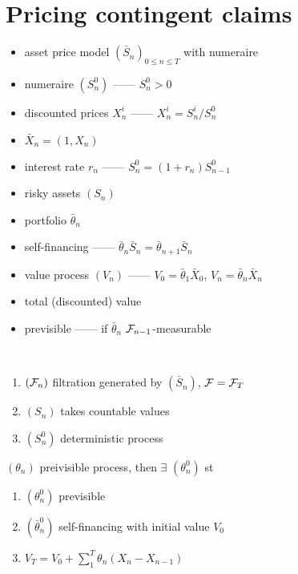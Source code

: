 \section{Pricing contingent claims}\label{sec:pricing-contingent-claims}

\begin{itemize}
    \item asset price model $(\bar S_n)_{0\leq n \leq T}$ with numeraire
    \item numeraire $(S_n^0)$ ------ $S^0_n > 0$
    \item discounted prices $X_n^i$ ------ $X_n^i = S^i_n / S_n^0$
    \item $\bar X_n = (1, X_n)$
    \item interest rate $r_n$ ------ $S_n^0 = (1 + r_n) S^0_{n-1}$
    \item risky assets $(S_n)$
    \item portfolio $\bar \theta_n$
    \item self-financing ------ $\bar \theta_n \bar S_n = \bar \theta_{n+1} \bar S_n$
    \item value process $(V_n)$ ------ $V_0 = \bar \theta_1 \bar X_0$, $V_n = \bar \theta_n \bar X_n$
    \item total (discounted) value
    \item previsible ------ if $\bar \theta_n$ $\mathcal{F}_{n-1}$-measurable
\end{itemize}

\begin{setting}\,
    \begin{enumerate}
        \item $(\mathcal{F}_n)$ filtration generated by $(\bar S_n)$, $\mathcal{F} = \mathcal{F}_T$
        \item $(S_n)$ takes countable values
        \item $(S_n^0)$ deterministic process
    \end{enumerate}
\end{setting}

\begin{prop}
    $(\theta_n)$ preivisible process, then $\exists$ $(\theta_n^0)$ st
    \begin{enumerate}
        \item $(\theta_n^0)$ previsible
        \item $(\bar\theta_n^0)$ self-financing with initial value $V_0$
        \item $V_T = V_0 + \sum^T_1 \theta_n(X_n - X_{n-1})$
    \end{enumerate}
\end{prop}

